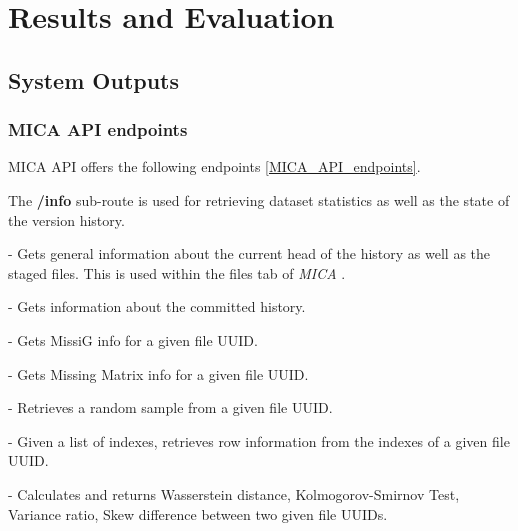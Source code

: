 \documentclass[a4paper, 11pt]{article}
\newcommand{\mica}{\textit{MICA }}
\begin{document}
\section{Results and Evaluation}
\subsection{System Outputs}      

\subsubsection{MICA API endpoints}      
MICA API offers the following endpoints \cref{MICA_API_endpoints}.

The \textbf{/info} sub-route is used for retrieving dataset statistics as well
as the state of the version history.
\begin{description}[labelindent=1cm, leftmargin=2.5cm]
        \item[GetFilesInfo] - Gets general information about the current head
                of the history as well as the staged files. This is used within
                the files tab of \mica.

        \item[GetParentHistory] - Gets information about the committed
                history.

        \item[GetMissiGInfo] - Gets MissiG info for a given file UUID.

        \item[GetMissingMatrixInfo] - Gets Missing Matrix info for a given file
                UUID.

        \item[GetSample] - Retrieves a random sample from a given file UUID.

        \item[GetRows] - Given a list of indexes, retrieves row information
                from the indexes of a given file UUID.

        \item[GetCompareInfo] - Calculates and returns Wasserstein distance,
                Kolmogorov-Smirnov Test, Variance ratio, Skew difference
                between two given file UUIDs.
\end{description}
\end{document}
